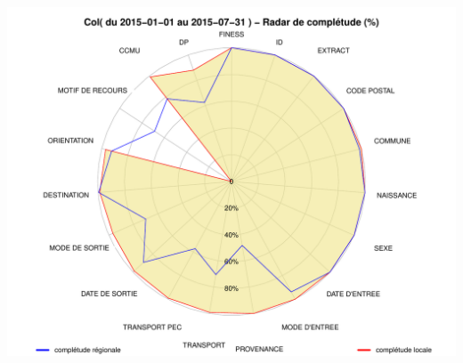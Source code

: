 \documentclass[]{article}
\begin{document}
\includegraphics{completude_files/figure-latex/finess-13.pdf}
\end{document}
